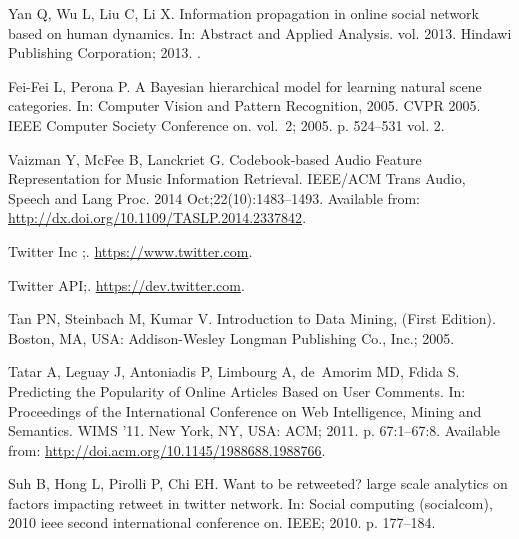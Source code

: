 \documentclass[10pt,letterpaper]{article}
\begin{document}
\begin{thebibliography}{10}
Yan Q, Wu L, Liu C, Li X.
\newblock Information propagation in online social network based on human
  dynamics.
\newblock In: Abstract and Applied Analysis. vol. 2013. Hindawi Publishing
  Corporation; 2013. .

Fei-Fei L, Perona P.
\newblock A Bayesian hierarchical model for learning natural scene categories.
\newblock In: Computer Vision and Pattern Recognition, 2005. CVPR 2005. IEEE
  Computer Society Conference on. vol.~2; 2005. p. 524--531 vol. 2.

Vaizman Y, McFee B, Lanckriet G.
\newblock Codebook-based Audio Feature Representation for Music Information
  Retrieval.
\newblock IEEE/ACM Trans Audio, Speech and Lang Proc. 2014
  Oct;22(10):1483--1493.
\newblock Available from: \url{http://dx.doi.org/10.1109/TASLP.2014.2337842}.

{Twitter Inc };.
\newblock \url{https://www.twitter.com}.

{Twitter API};.
\newblock \url{https://dev.twitter.com}.

Tan PN, Steinbach M, Kumar V.
\newblock Introduction to Data Mining, (First Edition).
\newblock Boston, MA, USA: Addison-Wesley Longman Publishing Co., Inc.; 2005.

Tatar A, Leguay J, Antoniadis P, Limbourg A, de~Amorim MD, Fdida S.
\newblock Predicting the Popularity of Online Articles Based on User Comments.
\newblock In: Proceedings of the International Conference on Web Intelligence,
  Mining and Semantics. WIMS '11. New York, NY, USA: ACM; 2011. p. 67:1--67:8.
\newblock Available from: \url{http://doi.acm.org/10.1145/1988688.1988766}.

Suh B, Hong L, Pirolli P, Chi EH.
\newblock Want to be retweeted? large scale analytics on factors impacting
  retweet in twitter network.
\newblock In: Social computing (socialcom), 2010 ieee second international
  conference on. IEEE; 2010. p. 177--184.

\end{thebibliography}
\end{document}
